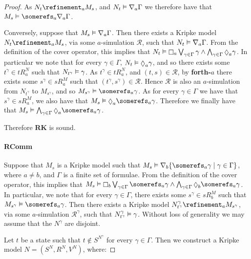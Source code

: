 \begin{proof}
As $N_t \refinement_a M_s$, and $N_t \vDash \nabla_a \Gamma$ we therefore
have that $M_s \entails \somerefs_a \covers_a \Gamma$.

Conversely, suppose that $M_s \vDash \nabla_a \Gamma$. Then there exists a
Kripke model $N_t \refinement_a M_s$, via some $a$-simulation $\mathcal{R}$,
such that $N_t \vDash \nabla_a \Gamma$. From the definition of the cover
operator, this implies that $N_t \entails \knows_a \bigvee_{\gamma \in \Gamma}
\gamma \land \bigwedge_{\gamma \in \Gamma} \suspects_a \gamma$. In particular we
note that for every $\gamma \in \Gamma$, $N_t \entails \suspects_a \gamma$, and
so there exists some $t^\gamma \in tR^N_a$ such that $N_{t^\gamma} \vDash
\gamma$. As $t^\gamma \in tR^N_a$, and $(t, s) \in \mathcal{R}$, by {\bf
forth-$a$} there exists some $s^\gamma \in sR^M_a$ such that $(t^\gamma, s^\gamma)
\in \mathcal{R}$. Hence $\mathcal{R}$ is also an $a$-simulation from
$N_{t^\gamma}$ to $M_{s^\gamma}$, and so $M_{s^\gamma} \entails \somerefs_a
\gamma$. As for every $\gamma \in \Gamma$ we have that $s^\gamma \in sR^M_a$, we
also have that $M_s \entails \suspects_a \somerefs_a \gamma$. Therefore we
finally have that $M_s \entails \bigwedge_{\gamma \in \Gamma} \suspects_a
\somerefs_a \gamma$.

Therefore {\bf RK} is sound.

\paragraph{RComm}
Suppose that $M_s$ is a Kripke model such that $M_s \entails \covers_b \{
\somerefs_a \gamma \mid \gamma \in \Gamma\}$, where $a \ne b$, and $\Gamma$ is a
finite set of formulae. From the definition of the cover operator, this implies
that $M_s \entails \knows_b \bigvee_{\gamma \in \Gamma} \somerefs_a \gamma \land
\bigwedge_{\gamma \in \Gamma} \suspects_b \somerefs_a \gamma$. In particular, we
note that for every $\gamma \in \Gamma$, there exists some $s^\gamma \in sR^M_b$
such that $M_{s^\gamma} \entails \somerefs_a \gamma$.  Then there exists a
Kripke model $N^\gamma_{t^\gamma} \refinement_a M_{s^\gamma}$, via some
$a$-simulation $\mathcal{R}^\gamma$, such that $N^\gamma_{t^\gamma} \vDash
\gamma$. Without loss of generality we may assume that the $N^\gamma$ are
disjoint.

Let $t$ be a state such that $t \notin S^{N^\gamma}$ for every $\gamma \in
\Gamma$. Then we construct a Kripke model $N = (S^N, R^N, V^N)$, where:


\end{proof}
